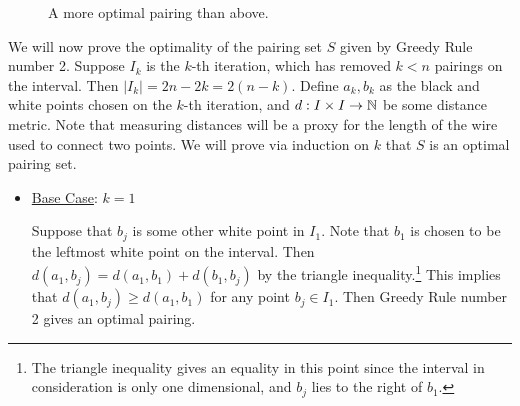 \begin{solution}
    \newpage
    
    \begin{figure}[!h]
    \vspace{1.5cm}
        \centering
        \caption{A more optimal pairing than above.}
        \label{fig:GR1 better}
    \end{figure}

    We will now prove the optimality of the pairing set $S$ given by Greedy Rule number 2. Suppose $I_k$ is the $k$-th iteration, which has removed $k < n$ pairings on the interval. Then $|I_k| = 2n - 2k = 2(n - k)$. Define $a_k, b_k$ as the black and white points chosen on the $k$-th iteration, and $d: I \times I \rightarrow \mathbb{N}$ be some distance metric. Note that measuring distances will be a proxy for the length of the wire used to connect two points. We will prove via induction on $k$ that $S$ is an optimal pairing set. 
    \begin{itemize}[-]
        \item \underline{Base Case}: $k = 1$

        \jump
        Suppose that $b_j$ is some other white point in $I_1$. Note that $b_1$ is chosen to be the leftmost white point on the interval. Then $d(a_1, b_j) = d(a_1, b_1) + d(b_1, b_j)$ by the triangle inequality.\footnote{The triangle inequality gives an equality in this point since the interval in consideration is only one dimensional, and $b_j$ lies to the right of $b_1$.} This implies that $d(a_1, b_j) \geq d(a_1, b_1)$ for any point $b_j \in I_1$. Then Greedy Rule number 2 gives an optimal pairing.


\end{itemize}
\end{solution}
